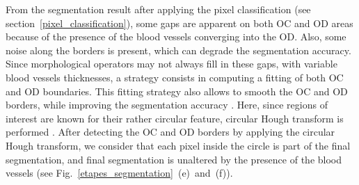 From the segmentation result after applying the pixel classification (see \mbox{section \ref{pixel_classification}}), some gaps are apparent on both OC and OD areas because of the presence of the blood vessels converging into the OD. Also, some noise along the borders is present, which can degrade the segmentation accuracy.
Since morphological operators may not always fill in these gaps, with variable blood vessels thicknesses, a strategy consists in computing a fitting of both OC and OD boundaries. This fitting strategy also allows to smooth the OC and OD borders, while improving the segmentation accuracy \citep{wong}. Here, since regions of interest are known for their rather circular feature, circular Hough transform \citep{pedersen} is performed \citep{aquino,zhu}. 
After detecting the OC and OD borders by applying the circular Hough transform, we consider that each pixel inside the circle is part of the final segmentation, and final segmentation is unaltered by the presence of the blood vessels (see \mbox{Fig. \ref{etapes_segmentation} (e) and (f)}).

